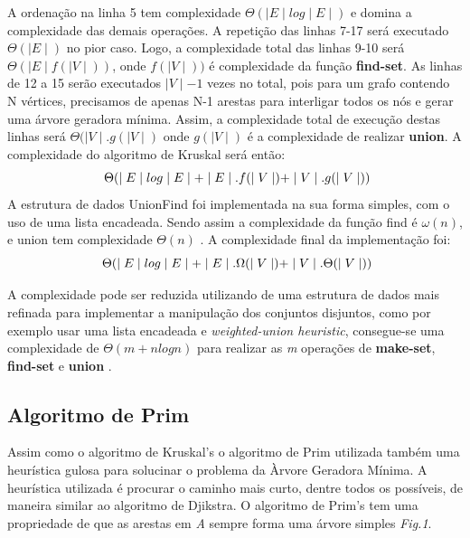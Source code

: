 \documentclass[a4paper,12pt]{article}
\begin{document}
A ordenação na linha 5 tem complexidade \emph{ $\Theta( \mid E\mid log \mid E\mid )$ } e domina a complexidade das demais operações.
A repetição das linhas 7-17 será executado \emph{$\Theta(\mid E\mid)$} no pior caso.
Logo, a complexidade total das linhas 9-10 será \emph{$\Theta(\mid E\mid f(\mid V\mid))$}, onde $f(\mid V\mid))$ é complexidade da função \textbf{{\color{blue}find-set}}.
As linhas de 12 a 15 serão executados $\mid V\mid -1$ vezes no total, pois para um grafo contendo N vértices, precisamos de apenas N-1 arestas para interligar todos os nós e gerar uma árvore geradora mínima. 
Assim, a complexidade total de execução destas linhas será \emph{ $\Theta(\mid V\mid . g(\mid V\mid)$} onde $g(\mid V\mid)$ é a complexidade de realizar \textbf{{\color{blue}union}}.
A complexidade do algoritmo de Kruskal será então: \[ \emph{ $\Theta(\mid E\mid log \mid E\mid + \mid E\mid .f(\mid V\mid) + \mid V\mid . g(\mid V\mid)) $}\]
A estrutura de dados UnionFind foi implementada na sua forma simples, com o uso de uma lista encadeada. Sendo assim a complexidade da função find é \emph{$\omega(n)$}, e union tem complexidade \emph{$\Theta(n)$} \cite{Cormem}. A complexidade final da implementação foi:
\[ \emph{ $\Theta(\mid E\mid log \mid E\mid + \mid E\mid .\Omega(\mid V\mid) + \mid V\mid . \Theta(\mid V\mid)) $}\]

A complexidade pode ser reduzida utilizando de uma estrutura de dados mais refinada para implementar a manipulação dos conjuntos disjuntos, como por exemplo usar uma lista encadeada e \emph{weighted-union heuristic}\cite{Cormem}, consegue-se uma complexidade de \emph{$\Theta(m+nlogn) $} para realizar as \emph{m} operações de \textbf{{\color{blue}make-set}}, \textbf{{\color{blue}find-set}} e \textbf{{\color{blue}union}} \cite{Cormem}.
\newpage
\subsection{Algoritmo de Prim}
Assim como o algoritmo de Kruskal's o algoritmo de Prim utilizada também uma heurística gulosa para solucinar o problema da Àrvore Geradora Mínima. A heurística utilizada é procurar o caminho mais curto, dentre todos os possíveis, de maneira similar ao algoritmo de Djikstra. O algoritmo de Prim's tem uma propriedade de que as arestas em \emph{A} sempre forma uma árvore simples \emph{Fig.1}.
\end{document}

